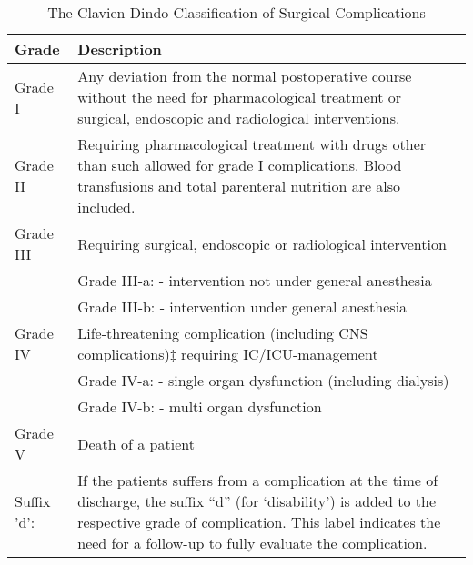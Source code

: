 \begin{sidewaystable}[htbp]
\caption{The Clavien-Dindo Classification of Surgical Complications}
\label{table:clavien-dindo}
\centering
\begin{tabular}{|l m{15cm}|}
 \hline
 Grade  &   Description  \\ \hline
 
 Grade I     &   Any deviation from the normal postoperative course without the need for pharmacological treatment or surgical, endoscopic and radiological interventions. \\ 
 
Grade II      &   Requiring pharmacological treatment with drugs other than such allowed for grade I complications. Blood transfusions and total parenteral nutrition are also included.\\ 
Grade III     &   Requiring surgical, endoscopic or radiological intervention\\
                &  Grade III-a: - intervention not under general anesthesia\\
                &  Grade III-b: - intervention under general anesthesia\\ 
Grade IV       &  Life-threatening complication (including CNS complications)‡ requiring IC/ICU-management\\
                &   Grade IV-a: - single organ dysfunction (including dialysis)\\
                &   Grade IV-b: - multi organ dysfunction\\ 
Grade V        &   Death of a patient\\ \hline
Suffix 'd':     &   If the patients suffers from a complication at the time of discharge,  the suffix  “d”  (for ‘disability’) is added to the respective grade of complication. This label indicates the need for a follow-up to fully evaluate the complication.\\ \hline
 
 
\end{tabular}

\end{sidewaystable}



 	
